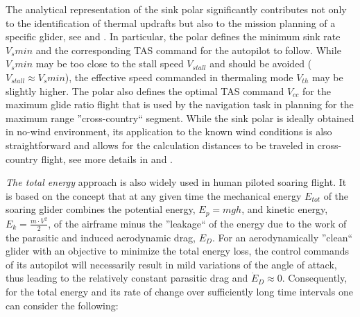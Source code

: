 \documentclass{ifacconf}
\begin{document}
The analytical representation of the sink polar significantly contributes not only to the identification of thermal updrafts but also to the mission planning of a specific glider, see \cite{Piggott:1997} and \cite{FAA:2011}. In particular, the polar defines the minimum sink rate $V_{s}min$ and the corresponding TAS command for the autopilot to follow. While $V_{s}min$ may be too close to the stall speed $V_{stall}$ and should be avoided ($V_{stall} \approx V_{s}min$), the effective speed commanded in thermaling mode $V_{th}$ may be slightly higher. The polar also defines the optimal TAS command  $V_{cc}$ for the maximum glide ratio flight that is used by the navigation task in planning for the maximum range ''cross-country`` segment. While the sink polar is ideally obtained in no-wind environment, its application to the known wind conditions is also straightforward and allows for the calculation distances to be traveled in cross-country flight, see more details in \cite{Piggott:1997} and \cite{FAA:2011}.


\emph{The total energy} approach is also widely used in human piloted soaring flight. It is based on the concept that at any given time the mechanical energy $E_{tot}$ of the soaring glider combines the potential energy, $E_p=mgh$, and kinetic energy, $E_k=\frac{m\cdot V^2}{2}$, of the airframe minus the ''leakage`` of the energy due to the work of the parasitic and induced aerodynamic drag, $E_{D}$. For an aerodynamically ''clean``  glider with an objective to minimize the total energy loss, the control commands of its autopilot will necessarily result in mild variations of the angle of attack, thus leading to the relatively constant parasitic drag and $\dot{E}_{D}\approx0$. Consequently, for the total energy and its rate of change over sufficiently long time intervals one can consider the following:

\end{document}
